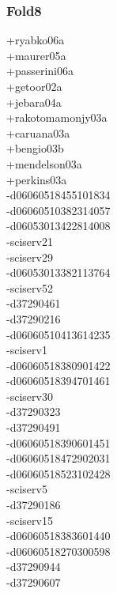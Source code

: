 \begin{multicols}{3}
\subsubsection*{Fold8}
+ryabko06a\\
+maurer05a\\
+passerini06a\\
+getoor02a\\
+jebara04a\\
+rakotomamonjy03a\\
+caruana03a\\
+bengio03b\\
+mendelson03a\\
+perkins03a\\
-d06060518455101834\\
-d06060510382314057\\
-d06053013422814008\\
-sciserv21\\
-sciserv29\\
-d06053013382113764\\
-sciserv52\\
-d37290461\\
-d37290216\\
-d06060510413614235\\
-sciserv1\\
-d06060518380901422\\
-d06060518394701461\\
-sciserv30\\
-d37290323\\
-d37290491\\
-d06060518390601451\\
-d06060518472902031\\
-d06060518523102428\\
-sciserv5\\
-d37290186\\
-sciserv15\\
-d06060518383601440\\
-d06060518270300598\\
-d37290944\\
-d37290607\\

\end{multicols}
